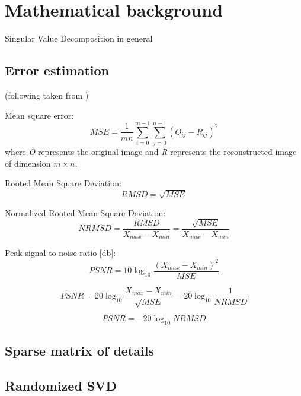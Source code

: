 \section{Mathematical background}
\label{sec:math}

Singular Value Decomposition in general


\subsection{Error estimation}


(following taken from \cite{SairaBanu2015})

Mean square error:
$$MSE=\frac{1}{m n} \sum_{i=0}^{m-1} \sum_{j=0}^{n-1} (O_{ij} - R_{ij})^{2}$$
where \textit{O} represents the original image and \textit{R} represents the
reconstructed image of dimension $m \times n$.

Rooted Mean Square Deviation:
$$RMSD=\sqrt{MSE}$$

Normalized Rooted Mean Square Deviation:
$$NRMSD=\frac{RMSD}{X_{max}-X_{min}}=\frac{\sqrt{MSE}}{X_{max}-X_{min}}$$

Peak signal to noise ratio [db]:
$$PSNR=10\log_{10}\frac{(X_{max}-X_{min})^{2}}{MSE}$$

$$PSNR=20\log_{10}\frac{X_{max}-X_{min}}{\sqrt{MSE}}=20\log_{10}\frac{1}{NRMSD}$$

$$PSNR=-20\log_{10}NRMSD$$

\subsection{Sparse matrix of details}

\subsection{Randomized SVD}